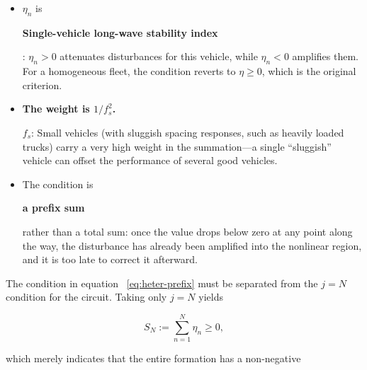 \documentclass[11pt,a4paper,openany]{book}
\numberwithin{equation}{chapter}
\numberwithin{figure}{chapter}
\numberwithin{table}{chapter}
\begin{document}
\begin{itemize}[leftmargin=1.4em,itemsep=4pt]
\item $\eta_n$ is




\textbf{Single-vehicle long-wave stability index}




: $\eta_n>0$ attenuates disturbances for this vehicle, while $\eta_n<0$ amplifies them. For a homogeneous fleet, the condition reverts to $\eta\ge0$, which is the original criterion.







\item \textbf{The weight is $1/f_s^2$.}




$f_s$: Small vehicles (with sluggish spacing responses, such as heavily loaded trucks) carry a very high weight in the summation—a single “sluggish” vehicle can offset the performance of several good vehicles.







\item




The condition is




\textbf{a prefix sum}




rather than a total sum: once the value drops below zero at any point along the way, the disturbance has already been amplified into the nonlinear region, and it is too late to correct it afterward.







\end{itemize}










The condition in equation ~\eqref{eq:heter-prefix} must be separated from the $j=N$ condition for the circuit. Taking only $j=N$ yields

\[
S_N:=\sum_{n=1}^{N}\eta_n\ge0,
\]

which merely indicates that the entire formation has a non-negative
\end{document}
